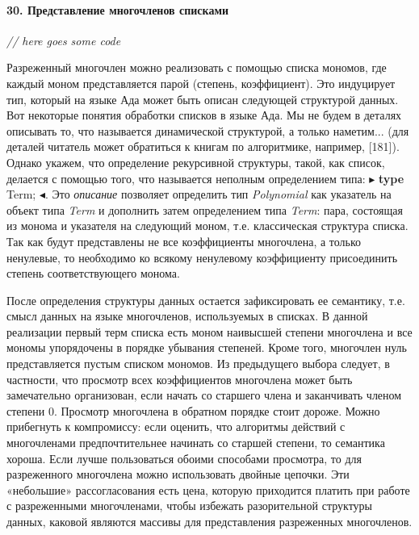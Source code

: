 \documentclass{../../template/mai_book}
\begin{document}
\newpage


\paragraph{30. Представление многочленов списками}

\textit{// here goes some code}

Разреженный многочлен можно реализовать с помощью списка мономов, где каждый моном представляется парой (степень, коэффициент). Это индуцирует тип, который на языке Ада может быть описан следующей структурой данных. Вот некоторые понятия обработки списков в языке Ада. Мы не будем в деталях описывать то, что называется динамической структурой, а только наметим... (для деталей читатель может обратиться к книгам по алгоритмике, например, [181]). Однако укажем, что определение рекурсивной структуры, такой, как список, делается с помощью того, что называется неполным определением типа: $\blacktriangleright$ \textbf{type} Term; $\blacktriangleleft$. Это \textit{описание} позволяет определить тип \textit{Polynomial} как указатель на объект типа \textit{Term} и дополнить затем определением типа \textit{Term}: пара, состоящая из монома и указателя на следующий моном, т.е. классическая структура списка. Так как будут представлены не все коэффициенты многочлена, а только ненулевые, то необходимо ко всякому ненулевому коэффициенту присоединить степень соответствующего монома.

После определения структуры данных остается зафиксировать ее семантику, т.е. смысл данных на языке многочленов, используемых в списках. В данной реализации первый терм списка есть моном наивысшей степени многочлена и все мономы упорядочены в порядке убывания степеней. Кроме того, многочлен нуль представляется пустым списком мономов. Из предыдущего выбора следует, в частности, что просмотр всех коэффициентов многочлена может быть замечательно организован, если начать со старшего члена и заканчивать членом степени 0. Просмотр многочлена в обратном порядке стоит дороже. Можно прибегнуть к компромиссу: если оценить, что алгоритмы действий с многочленами предпочтительнее начинать со старшей степени, то семантика хороша. Если лучше пользоваться обоими способами просмотра, то для разреженного многочлена можно использовать двойные цепочки. Эти «небольшие» рассогласования есть цена, которую приходится платить при работе с разреженными многочленами, чтобы избежать разорительной структуры данных, каковой являются массивы для представления разреженных многочленов.
\end{document}
